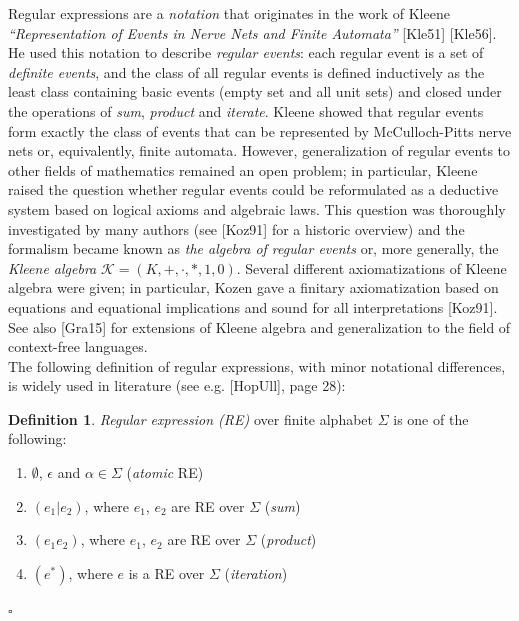 \documentclass{article}
\newcommand{\Xin}{\!\in\!}
\newcommand{\Xeq}{\!=\!}
\theoremstyle{definition}
\newtheorem{Xdef}{Definition}
\begin{document}
\begin{multicols}{2}
Regular expressions are a \emph{notation} that originates in the work of Kleene
\emph{``Representation of Events in Nerve Nets and Finite Automata''} [Kle51] [Kle56].
He used this notation to describe \emph{regular events}:
each regular event is a set of \emph{definite events},
and the class of all regular events is defined inductively
as the least class containing basic events (empty set and all unit sets)
and closed under the operations of \emph{sum}, \emph{product} and \emph{iterate}.
Kleene showed that regular events form exactly the class of events that can be represented by McCulloch-Pitts nerve nets or, equivalently, finite automata.
However, generalization of regular events to other fields of mathematics remained an open problem;
in particular, Kleene raised the question whether regular events could be reformulated
as a deductive system based on logical axioms and algebraic laws.
This question was thoroughly investigated by many authors (see [Koz91] for a historic overview)
and the formalism became known as \emph{the algebra of regular events} %
or, more generally, the \emph{Kleene algebra} $\mathcal{K} \Xeq (K, +, \cdot, *, 1, 0)$.
Several different axiomatizations of Kleene algebra were given;
in particular, Kozen gave a finitary axiomatization based on equations and equational implications and sound for all interpretations [Koz91].
See also [Gra15] for extensions of Kleene algebra and generalization to the field of context-free languages.
\\

The following definition of regular expressions, with minor notational differences, is widely used in literature
(see e.g. [HopUll], page 28):

    \begin{Xdef}\label{re}
    \emph{Regular expression (RE)} over finite alphabet $\Sigma$ is one of the following:
    \begin{enumerate}
        \medskip
        \item[] $\emptyset$, $\epsilon$ and $\alpha \Xin \Sigma$ (\emph{atomic} RE)
        \item[] $(e_1 | e_2)$, where $e_1$, $e_2$ are RE over $\Sigma$ (\emph{sum})
        \item[] $(e_1 e_2)$,   where $e_1$, $e_2$ are RE over $\Sigma$ (\emph{product})
        \item[] $(e^*)$,       where $e$ is a RE over $\Sigma$ (\emph{iteration})
        \medskip
    \end{enumerate}
    $\square$
    \end{Xdef}


\end{multicols}
\end{document}
